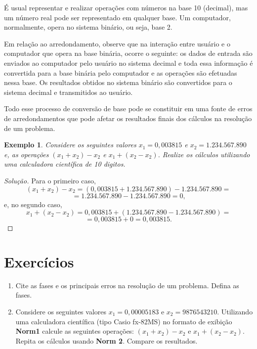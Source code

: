 \documentclass[
	12pt,				%
	openright,			%
	twoside,			%
	a4paper,			%
	english,			%
	french,				%
	brazil,				%
	sumario=tradicional
]{abntex2}
\newtheorem{example}{Exemplo}
\newenvironment{solution}{
	\begin{proof}[Solução]
}{\end{proof}}
\numberwithin{example}{chapter}
\numberwithin{remark}{chapter}
\numberwithin{definition}{chapter}
\numberwithin{figure}{chapter}
\begin{document}
É usual representar e realizar operações com números na base 10 (decimal), mas um número real pode ser representado em qualquer base. Um computador, normalmente, opera no sistema binário, ou seja, base 2.

Em relação ao arredondamento, observe que na interação entre usuário e o computador que opera na base binária, ocorre o seguinte: os dados de entrada são enviados ao computador pelo usuário no sistema decimal e toda essa informação é convertida para a base binária pelo computador e as operações são efetuadas nessa base. Os resultados obtidos no sistema binário são convertidos para o sistema decimal e transmitidos ao usuário.

Todo esse processo de conversão de base pode se constituir em uma fonte de erros de arredondamentos que pode afetar os resultados finais dos cálculos na resolução de um problema.

\begin{example}
	\label{example:x_1_x2_calculadora}
	Considere os seguintes valores $x_1=0,003815$ e $x_2=1.234.567.890$ e, as operações $(x_1+x_2)-x_2$ e $x_1+(x_2-x_2)$. Realize os cálculos utilizando uma calculadora científica de 10 digitos.
\end{example}

\begin{solution}
	Para o primeiro caso,
	$$(x_1+x_2)-x_2=(0,003815+1.234.567.890)-1.234.567.890=$$
	$$=1.234.567.890-1.234.567.890=0\text{,}$$
	e, no segundo caso,
	$$x_1+(x_2-x_2)=0,003815+(1.234.567.890-1.234.567.890)=$$
	$$=0,003815+0=0,003815\text{.}$$
\end{solution}


\section{Exercícios}

\begin{enumerate}
    \item Cite as fases e os principais erros na resolução de um problema. Defina as fases.
    
    \item Considere os seguintes valores $x_1=0,00005183$ e $x_2=9876543210$. Utilizando uma calculadora científica (tipo Casio fx-82MS) no formato de exibição \textbf{Norm1} calcule as seguintes operações: $(x_1+x_2)-x_2$ e $x_1+(x_2-x_2)$. Repita os cálculos usando \textbf{Norm 2}. Compare os resultados.
\end{enumerate}
\end{document}

